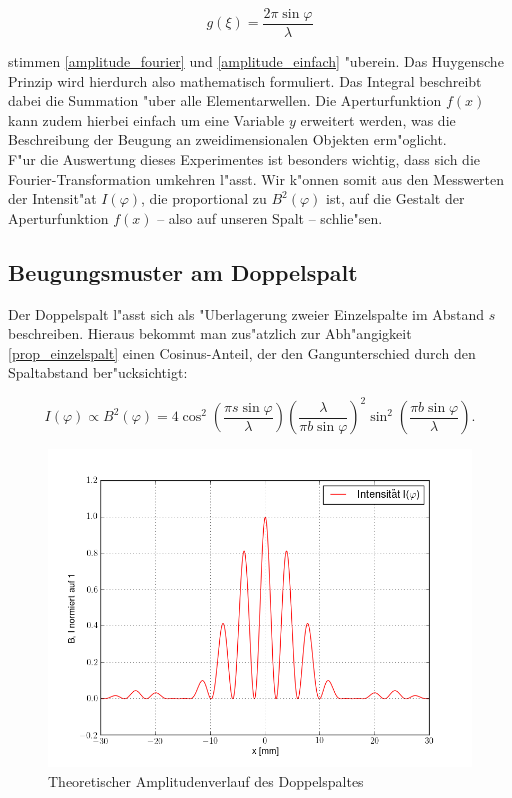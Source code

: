 		\begin{equation}
			g(\xi) = \frac{2 \pi \sin{\varphi}}{\lambda}
		\end{equation}

		stimmen \ref{amplitude_fourier} und \ref{amplitude_einfach} "uberein.
		Das Huygensche Prinzip wird hierdurch also mathematisch formuliert.
		Das Integral beschreibt dabei die Summation "uber alle Elementarwellen.
		Die Aperturfunktion $f(x)$ kann zudem hierbei einfach um eine Variable $y$ erweitert werden,
		was die Beschreibung der Beugung an zweidimensionalen Objekten erm"oglicht. \\
		F"ur die Auswertung dieses Experimentes ist besonders wichtig, dass sich die Fourier-Transformation umkehren l"asst.
		Wir k"onnen somit aus den Messwerten der Intensit"at $I(\varphi)$,
		die proportional zu $B^2(\varphi)$ ist, auf die Gestalt der Aperturfunktion $f(x)$
		--  also auf unseren Spalt -- schlie"sen.
		
	\subsection{Beugungsmuster am Doppelspalt}
		\label{sec:muster_doppelspalt}

		Der Doppelspalt l"asst sich als "Uberlagerung zweier Einzelspalte im Abstand $s$ beschreiben.
		Hieraus bekommt man zus"atzlich zur Abh"angigkeit \eqref{prop_einzelspalt} einen Cosinus-Anteil,
		der den Gangunterschied durch den Spaltabstand ber"ucksichtigt:

		\begin{equation}
			I(\varphi) \propto B^2(\varphi) = 
			4 \cos^2{\left( \frac{\pi s \sin{\varphi}}{\lambda} \right)}
			\left( \frac{\lambda}{\pi b \sin{\varphi}} \right)^2
			\sin^2{\left( \frac{\pi b \sin{\varphi}}{\lambda} \right)} .
			\label{prop_doppelspalt}
		\end{equation}

		\begin{figure}[h]
			\centering
			\includegraphics[width = 15cm]{theorie_2.png}
			\caption{Theoretischer Amplitudenverlauf des Doppelspaltes}
			\label{theoriekurve_doppelspalt}
		\end{figure}
